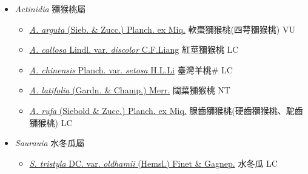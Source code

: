 
  \begin{itemize}
 \item[] \textit{Actinidia} 獼猴桃屬
                    
  \begin{itemize}
        \item[] \href{http://www.theplantlist.org/tpl1.1/search?q=Actinidia+arguta}{\textit{A. arguta} (Sieb. \& Zucc.) Planch. ex Miq.}     軟棗獼猴桃(四萼獼猴桃)   VU
        \item[] \href{http://www.theplantlist.org/tpl1.1/search?q=Actinidia+callosa+var.+discolor}{\textit{A. callosa} Lindl. var. \textit{discolor} C.F.Liang}     紅莖獼猴桃 LC
        \item[] \href{http://www.theplantlist.org/tpl1.1/search?q=Actinidia+chinensis+var.+setosa}{\textit{A. chinensis} Planch. var. \textit{setosa} H.L.Li}   臺灣羊桃\# LC
        \item[] \href{http://www.theplantlist.org/tpl1.1/search?q=Actinidia+latifolia}{\textit{A. latifolia} (Gardn. \& Champ.) Merr.}   闊葉獼猴桃 NT
        \item[] \href{http://www.theplantlist.org/tpl1.1/search?q=Actinidia+rufa}{\textit{A. rufa} (Siebold \& Zucc.) Planch. ex Miq.}        腺齒獼猴桃(硬齒獼猴桃、駝齒獼猴桃)    LC
  \end{itemize}
 \item[] \textit{Saurauia} 水冬瓜屬
                    
  \begin{itemize}
        \item[] \href{http://www.theplantlist.org/tpl1.1/search?q=Saurauia+tristyla+var.+oldhamii}{\textit{S. tristyla} DC. var. \textit{oldhamii} (Hemsl.) Finet \& Gagnep.}   水冬瓜 LC
  \end{itemize}
  \end{itemize}

